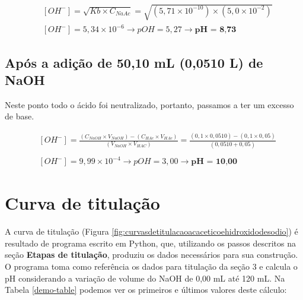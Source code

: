 \documentclass[a4paper, 12pt]{article}
\begin{document}
\begin{fleqn}
	\begin{align*}
		&[OH^{-}] = \sqrt{Kb \times C_{NaAc}} = \sqrt{(5,71 \times 10^{-10}) \times (5,0 \times 10^{-2})} \\
		&[OH^{-}] = 5,34 \times 10^{-6} \longrightarrow	 pOH = 5,27 \longrightarrow	 \textbf{pH = 8,73}
	\end{align*}
\end{fleqn}

\subsection{Após a adição de 50,10 mL (0,0510 L) de NaOH}
Neste ponto todo o ácido foi neutralizado, portanto, passamos a ter um excesso de base.

\begin{fleqn}
	\begin{align*}
		&[OH^{-}] = \frac{ (C_{NaOH} \times V_{NaOH}) - (C_{HAc} \times V_{HAc}) }{ (V_{NaOH} \times V_{HAC}) } = \frac{ (0,1 \times 0,0510) - (0,1 \times 0,05) }{ (0,0510 + 0,05) } \\ \\	
		&[OH^{-}] = 9,99 \times 10^{-4} \longrightarrow	 pOH = 3,00 \longrightarrow	 \textbf{pH = 10,00}
	\end{align*}
\end{fleqn}

\section{Curva de titulação}
A curva de titulação (Figura \ref{fig:curvasdetitulacaoacaceticoehidroxidodesodio}) é resultado de programa escrito em Python, que, utilizando os passos descritos na seção \textbf{Etapas de titulação}, produziu os dados necessários para sua construção. \\

O programa toma como referência os dados para titulação da seção 3 e calcula o pH considerando a variação de volume do NaOH de 0,00 mL até 120 mL. Na Tabela \ref{demo-table} podemos ver os primeiros e últimos valores deste cálculo:
\end{document}
